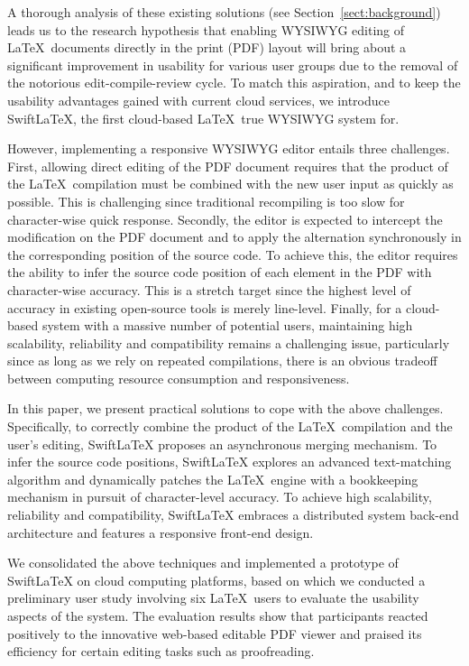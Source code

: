 \documentclass[sigconf]{acmart}
\newcommand{\todo}[1]{\textbf{\{TODO: #1\}}}
\begin{document}
A thorough analysis of these existing solutions (see Section~\ref{sect:background}) leads us to the research hypothesis that enabling WYSIWYG editing of  \LaTeX\ documents directly in the print (PDF) layout will bring about a significant improvement in usability for various user groups due to the removal of the notorious edit-compile-review cycle. 
To match this aspiration, and to keep the usability advantages gained with current cloud services, we introduce SwiftLaTeX, the first cloud-based \LaTeX\ true WYSIWYG system for.


However, implementing a responsive WYSIWYG editor entails three challenges. First, allowing direct editing of the PDF document requires that the product of the \LaTeX\ compilation must be combined with the new user input as quickly as possible. This is challenging since traditional recompiling is too slow for character-wise quick response.
Secondly, the editor is expected to intercept the modification on the PDF document and to  apply the alternation synchronously in the corresponding position of the source code.  
To achieve this, the editor requires the ability to infer the source code position of each element in the PDF with character-wise accuracy. 
This is a stretch target since the highest level of accuracy in  existing open-source tools is merely line-level.
Finally, for a cloud-based system with a massive number of potential users, maintaining high scalability, reliability and compatibility remains a challenging issue, 
particularly since as long as we rely on repeated compilations, there is an obvious  tradeoff between computing resource consumption and responsiveness.

In this paper, we present practical solutions to cope with the above challenges. Specifically, to correctly combine the product of the \LaTeX\ compilation and the user's editing, SwiftLaTeX proposes an asynchronous merging mechanism.
To infer the source code positions, SwiftLaTeX explores an advanced text-matching algorithm and dynamically patches the \LaTeX\ engine with a bookkeeping mechanism in pursuit of character-level accuracy. To achieve high scalability, reliability and compatibility, SwiftLaTeX embraces a distributed system back-end architecture and features a responsive front-end design. 

We consolidated the above techniques and implemented a  prototype of SwiftLaTeX on cloud computing platforms, based on which we conducted a preliminary user study involving six \LaTeX\ users to evaluate the usability aspects of the system. The evaluation results show that participants reacted positively to the innovative web-based editable PDF viewer and praised its efficiency for certain editing tasks such as proofreading.
\end{document}
